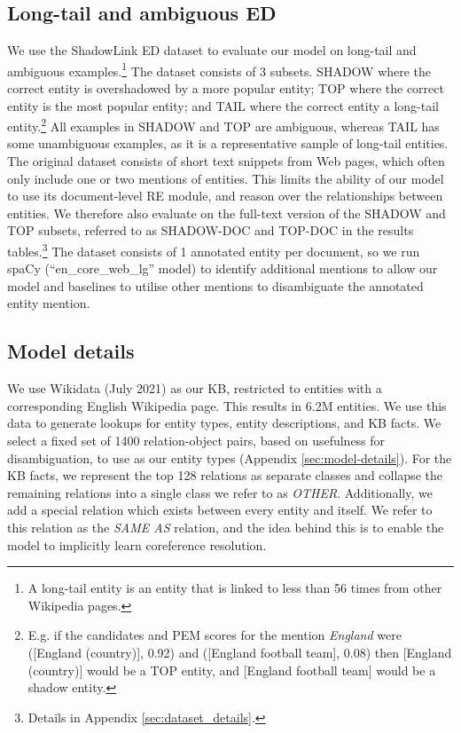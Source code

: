 \documentclass[11pt]{article}
\begin{document}
\subsection{Long-tail and ambiguous ED}
We use the ShadowLink ED dataset \citep{provatorova-etal-2021-robustness} to evaluate our model on long-tail and ambiguous examples.\footnote{A long-tail entity is an entity that is linked to less than 56 times from other Wikipedia pages.} The dataset consists of 3 subsets. SHADOW where the correct entity is overshadowed by a more popular entity; TOP where the correct entity is the most popular entity; and TAIL where the correct entity a long-tail entity.\footnote{E.g. if the candidates and PEM scores for the mention \emph{England} were ([England (country)], 0.92) and ([England football team], 0.08) then [England (country)] would be a TOP entity, and [England football team] would be a shadow entity.} All examples in SHADOW and TOP are ambiguous, whereas TAIL has some unambiguous examples, as it is a representative sample of long-tail entities. The original dataset consists of short text snippets from Web pages, which often only include one or two mentions of entities. This limits the ability of our model to use its document-level RE module, and reason over the relationships between entities. We therefore also evaluate on the full-text version of the {SHADOW} and TOP subsets, referred to as {SHADOW-DOC} and {TOP-DOC} in the results tables.\footnote{Details in Appendix \ref{sec:dataset_details}.} The dataset consists of 1 annotated entity per document, so we run spaCy (``en\_core\_web\_lg'' model) \cite{spacy2} to identify additional mentions to allow our model and baselines to utilise other mentions to disambiguate the annotated entity mention.





\subsection{Model details}
We use Wikidata (July 2021) as our KB, restricted to entities with a corresponding English Wikipedia page. This results in 6.2M entities. We use this data to generate lookups for entity types, entity descriptions, and KB facts. We select a fixed set of 1400 relation-object pairs, based on usefulness for disambiguation, to use as our entity types (Appendix \ref{sec:model-details}). For the KB facts, we represent the top 128 relations as separate classes and collapse the remaining relations into a single class we refer to as \emph{OTHER}. Additionally, we add a special relation which exists between every entity and itself. We refer to this relation as the \emph{SAME AS} relation, and the idea behind this is to enable the model to implicitly learn coreference resolution.
\end{document}
